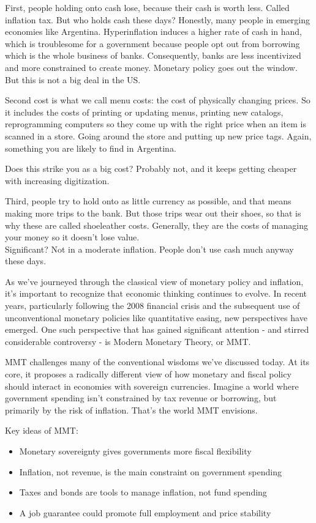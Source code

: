 \documentclass[10pt]{article}
\begin{document}
First, people holding onto cash lose, because their cash is worth less. Called inflation tax. But who holds cash these days? Honestly, many people in emerging economies like Argentina. Hyperinflation induces a higher rate of cash in hand, which is troublesome for a government because people opt out from borrowing which is the whole business of banks. Consequently, banks are less incentivized and more constrained to create money. Monetary policy goes out the window. But this is not a big deal in the US.

Second cost is what we call menu costs: the cost of physically changing prices. So it includes the costs of printing or updating menus, printing new catalogs, reprogramming computers so they come up with the right price when an item is scanned in a store. Going around the store and putting up new price tags. Again, something you are likely to find in Argentina.

Does this strike you as a big cost? Probably not, and it keeps getting cheaper with increasing digitization.

Third, people try to hold onto as little currency as possible, and that means making more trips to the bank. But those trips wear out their shoes, so that is why these are called shoeleather costs. Generally, they are the costs of managing your money so it doesn't lose value.\\
Significant? Not in a moderate inflation. People don't use cash much anyway these days.

As we've journeyed through the classical view of monetary policy and inflation, it's important to recognize that economic thinking continues to evolve. In recent years, particularly following the 2008 financial crisis and the subsequent use of unconventional monetary policies like quantitative easing, new perspectives have emerged. One such perspective that has gained significant attention - and stirred considerable controversy - is Modern Monetary Theory, or MMT.

MMT challenges many of the conventional wisdoms we've discussed today. At its core, it proposes a radically different view of how monetary and fiscal policy should interact in economies with sovereign currencies. Imagine a world where government spending isn't constrained by tax revenue or borrowing, but primarily by the risk of inflation. That's the world MMT envisions.

Key ideas of MMT:

\begin{itemize}
  \item Monetary sovereignty gives governments more fiscal flexibility
  \item Inflation, not revenue, is the main constraint on government spending
  \item Taxes and bonds are tools to manage inflation, not fund spending
  \item A job guarantee could promote full employment and price stability
\end{itemize}
\end{document}
